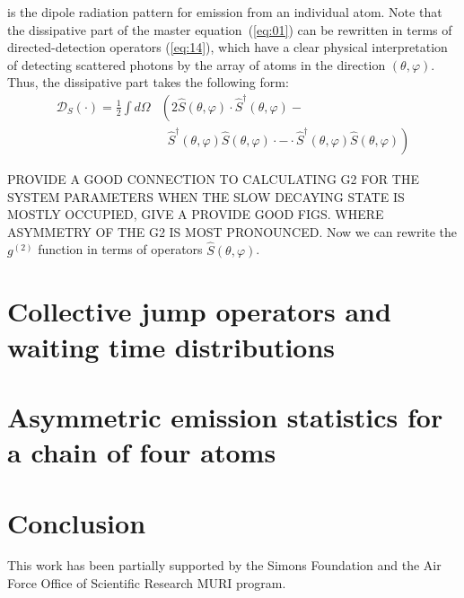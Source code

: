 \documentclass[aps,prl,twocolumn,superscriptaddress,showpacs,amsmath,amssymb]{revtex4-2}
\begin{document}
is the dipole radiation pattern for emission from an individual atom.
Note that the dissipative part of the master equation~(\ref{eq:01}) can be rewritten in terms of directed-detection operators (\ref{eq:14}), which have a clear physical interpretation of detecting scattered photons by the array of atoms in the direction $(\theta, \varphi)$.
Thus, the dissipative part takes the following form:
\begin{align}
    \label{eq:16}
    \mathcal{D}_S(\cdot) = \frac{1}{2} \int d \Omega & \left( 2 \hat{S}(\theta, \varphi) \cdot \hat{S}^\dagger(\theta, \varphi) - \right. \\
                                                   & \;\; \left. \hat{S}^\dagger(\theta, \varphi)\hat{S}(\theta, \varphi) \cdot - \cdot \hat{S}^\dagger(\theta, \varphi) \hat{S}(\theta, \varphi)\right) \nonumber
\end{align}

\uppercase{Provide a good connection to calculating g2 for the system parameters when the slow decaying state is mostly occupied, give a provide good figs. where asymmetry of the g2 is most pronounced.}
Now we can rewrite the $g^{(2)}$ function in terms of operators $\hat{S}(\theta, \varphi)$.




\section{Collective jump operators and waiting time distributions}

\section{Asymmetric emission statistics for a chain of four atoms}

\section{Conclusion}\label{sec:conclusion}

\begin{acknowledgments}
This work has been partially supported by the Simons Foundation and the Air Force Office of Scientific Research MURI program.
\end{acknowledgments}



\end{document}
